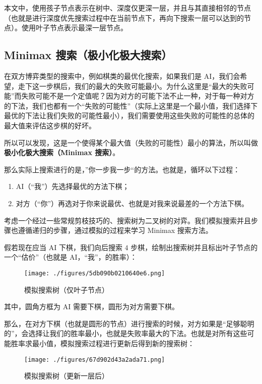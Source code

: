

本文中，使用孩子节点表示在树中、深度仅更深一层，并且与其直接相邻的节点（也就是进行深度优先搜索过程中在当前节点下，再向下搜索一层可以达到的节点）。使用叶子节点表示最深一层节点。

\subsection{Minimax 搜索（极小化极大搜索）}
在双方博弈类型的搜索中，例如棋类的最优化搜索，如果我们是 AI，我们会希望，走下这一步棋后，我们的最大的失败可能最小。为什么这里是“最大的失败可能”而失败可能不是一个定值呢？因为对方的可能下法不止一种，对于每一种对方的下法，我们也都有一个“失败的可能性”（实际上这里是一个最小值，我们选择下最优的下法让我们失败的可能性最小），我们需要使用这些失败的可能性的总体的最大值来评估这步棋的好坏。

所以可以发现，这是一个使得某个最大值（失败的可能性）最小的算法，所以叫做\textbf{极小化极大搜索（Minimax 搜索）}。

那么实际上搜索进行的是，”你一步我一步“的方法。也就是，循环以下过程：
\begin{enumerate}
\item AI（“我”）先选择最优的方法下棋；
\item 对方（“你”）再选对于你来说最优、也就是对我来说最差的一个方法下棋。
\end{enumerate}
考虑一个经过一些常规剪枝技巧的、搜索树为二叉树的对弈。我们模拟搜索并且步骤也遵循递归的步骤，通过模拟的过程来学习 Minimax 搜索方法。

假若现在应当 AI 下棋，我们向后搜索 $4$ 步棋，绘制出搜索树并且标出叶子节点的一个“估价”（也就是 AI，“我”，的胜率）：
\begin{figure}[ht]
\centering
\texttt{[image: ./figures/5db090b0210640e6.png]}
\caption{模拟搜索树（仅叶子节点）} \label{fig_mmsab_1}
\end{figure}
其中，圆角方框为 AI 需要下棋，圆形为对方需要下棋。

那么，在对方下棋（也就是圆形的节点）进行搜索的时候，对方如果是“足够聪明的”，会选择让我们的胜率最小，也就是失败率最大的下法。也就是对所有这些可能胜率求最小值，模拟搜索过程进行更新后得到新的搜索树：
\begin{figure}[ht]
\centering
\texttt{[image: ./figures/67d902d43a2ada71.png]}
\caption{模拟搜索树（更新一层后）} \label{fig_mmsab_3}
\end{figure}

